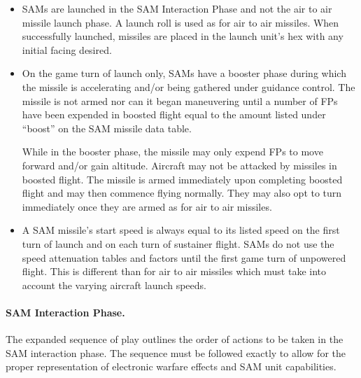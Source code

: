 \begin{itemize}

    

    \item{} SAMs are launched in the SAM Interaction Phase and not the air to air missile launch phase. A launch roll is used as for air to air missiles. When successfully launched, missiles are placed in the launch unit's hex with any initial facing desired.

    \item{} On the game turn of launch only, SAMs have a booster phase during which the missile is accelerating and/or being gathered under guidance control. The missile is not armed nor can it began maneuvering until a number of FPs have been expended in boosted flight equal to the amount listed under “boost” on the SAM missile data table.

    While in the booster phase, the missile may only expend FPs to move forward and/or gain altitude. Aircraft may not be attacked by missiles in boosted flight. The missile is armed immediately upon completing boosted flight and may then commence flying normally. They may also opt to turn immediately once they are armed as for air to air missiles.

    \item{} A SAM missile's start speed is always equal to its listed speed on the first turn of launch and on each turn of sustainer flight. SAMs do not use the speed attenuation tables and factors until the first game turn of unpowered flight. This is different than for air to air missiles which must take into account the varying aircraft launch speeds. 
    

\end{itemize}

\paragraph{SAM Interaction Phase.} The expanded sequence of play outlines the order of actions to be taken in the SAM interaction phase. The sequence must be followed exactly to allow for the proper representation of electronic warfare effects and SAM unit capabilities.

